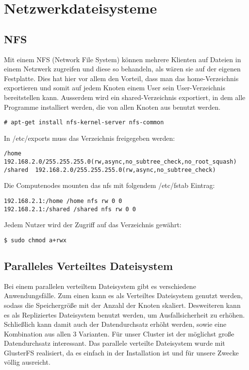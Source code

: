 \chapter{Netzwerkdateisysteme}
\section{NFS}
Mit einem NFS (Network File System) können mehrere Klienten auf Dateien
in einem Netzwerk zugreifen und diese so behandeln, als wären sie
auf der eigenen Festplatte.
Dies hat hier vor allem den Vorteil, dass man das home-Verzeichnis
exportieren und somit auf jedem Knoten einem User sein User-Verzeichnis
bereitstellen kann. Ausserdem wird ein shared-Verzeichnis exportiert, in dem 
alle Programme installiert werden, die von allen Knoten aus benutzt werden.
\begin{lstlisting}[style=Bash]
# apt-get install nfs-kernel-server nfs-common
\end{lstlisting}
In /etc/exports muss das Verzeichnis freigegeben werden:
\begin{lstlisting}[style=Bash,basicstyle=\small]
/home    192.168.2.0/255.255.255.0(rw,async,no_subtree_check,no_root_squash)
/shared  192.168.2.0/255.255.255.0(rw,async,no_subtree_check)
\end{lstlisting}
Die Computenodes mounten das nfs mit folgendem /etc/fstab Eintrag:
\begin{lstlisting}[style=Bash]
192.168.2.1:/home /home nfs rw 0 0
192.168.2.1:/shared /shared nfs rw 0 0
\end{lstlisting}
Jedem Nutzer wird der Zugriff auf das Verzeichnis gewährt:
\begin{lstlisting}[style=Bash]
$ sudo chmod a+rwx
\end{lstlisting}
\section{Paralleles Verteiltes Dateisystem}
Bei einem parallelen verteiltem Dateisystem gibt es verschiedene Anwendungsfälle.
Zum einen kann es als Verteiltes Dateisystem genutzt werden,
sodass die Speichergröße mit der Anzahl der Knoten skaliert.
Desweiteren kann es als Repliziertes Dateisystem benutzt werden,
um Ausfallsicherheit zu erhöhen.
Schließlich kann damit auch der Datendurchsatz erhöht werden, sowie eine Kombination aus allen 3 Varianten.
Für unser Cluster ist der möglichst große Datendurchsatz interessant.
Das parallele verteilte Dateisystem wurde mit GlusterFS realisiert,
da es einfach in der Installation ist und für unsere Zwecke völlig ausreicht.\\

